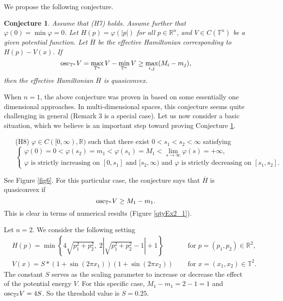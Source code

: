 \documentclass[12pt,reqno]{amsart}
\theoremstyle{plain}
\newtheorem{conj}{Conjecture}
\theoremstyle{remark}
\numberwithin{equation}{section}
\newcommand{\R}{\mathbb{R}}
\newcommand{\T}{\mathbb{T}}
\newcommand{\ol}{\overline}
\begin{document}
We propose the following conjecture.  

\begin{conj}\label{conj:convex} 
Assume that {\rm (H7)} holds. 
Assume further that $\varphi(0)=\min \varphi=0$.
Let $H(p)=\varphi(|p|)$ for all $p\in \R^n$, and $V\in C(\T^n)$ be a given potential function.
Let $\ol{H}$ be the effective Hamiltonian corresponding to $H(p)-V(x)$.
If 
\[
{\rm osc}_{\T ^n}V=\max_{\T^n} V - \min_{\T^n} V \geq   \max_{i, j}(M_i-m_j),
\]  
then the effective Hamiltonian $\ol {H}$ is quasiconvex.  
\end{conj}

When $n=1$, the above conjecture was proven in  \cite{ATY2} based on some essentially one dimensional approaches.  
In multi-dimensional spaces, this conjecture seems quite challenging in general (Remark 3 is a special case).  
Let us now consider a basic situation, which we believe is an important step toward proving Conjecture \ref{conj:convex}.
\begin{itemize}
\item[(H8)] $\varphi \in C([0,\infty),\R)$ such that
there exist $0<s_1<s_2<\infty$ satisfying
\[
\begin{cases}
\text{$\varphi(0)=0 < \varphi(s_2)=m_1 < \varphi(s_1)=M_1<\lim_{s \to \infty} \varphi(s)=+\infty$,}\\
\text{$\varphi$ is strictly increasing on $[0,s_1]$ and $[s_2,\infty)$ and $\varphi$ is strictly decreasing on $[s_1,s_2]$.}
\end{cases}
\]
\end{itemize}
See Figure \ref{fig6}.  For this particular case,  the conjecture says that $\ol H$ is quasiconvex if 
$$
{\rm osc}_{\T ^n}V\geq M_1-m_1.
$$
This is clear in terms of numerical results (Figure \ref{qtyEx2_1}).  

\smallskip


Let $n=2$.  We consider the following setting
\begin{align*}
&H(p) = \min\left\{4\sqrt{p_1^2+p_2^2},\; 2\left|\sqrt{p_1^2+p_2^2}-1\right|+1\right\} \quad &\text{ for } p=(p_1,p_2)\in \R^2,  \\
&V(x)= S*(1+\sin(2 \pi x_1))( 1+ \sin(2\pi x_2))  \quad &\text{ for } x=(x_1,x_2)\in \T^2.
\end{align*}
The constant $S$ serves as the scaling parameter to increase or decrease the effect of the potential energy $V$.  
For this specific case,  $M_1-m_1=2-1=1$ and ${\rm osc}_{\T ^2}V=4S$.  So the threshold value is $S=0.25$. 
\end{document}
